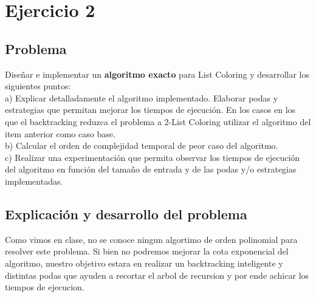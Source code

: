 \section{Ejercicio 2}
\subsection{Problema}
Dise\~nar e implementar un \textbf{algoritmo exacto} para List Coloring y desarrollar los siguientes puntos:\\

a) Explicar detalladamente el algoritmo implementado. Elaborar podas y estrategias que permitan mejorar los tiempos de ejecuci\'on. En los casos en los que el backtracking reduzca el problema a 2-List Coloring utilizar el algoritmo del item anterior como caso base.\\

b) Calcular el orden de complejidad temporal de peor caso del algoritmo.\\

c) Realizar una experimentaci\'on que permita observar los tiempos de ejecuci\'on del algoritmo en funci\'on del tama\~no de entrada y de las podas y/o estrategias implementadas.\\

\subsection{Explicaci\'on y desarrollo del problema}
Como vimos en clase, no se conoce ningun algortimo de orden polinomial para resolver este problema. Si bien no podremos mejorar la cota exponencial del algoritmo, nuestro objetivo estara en realizar un backtracking inteligente y distintas podas que ayuden a recortar el arbol de recursion y por ende achicar los tiempos de ejecucion. 

